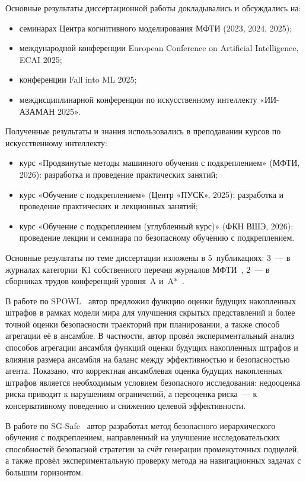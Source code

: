{\probation}
Основные результаты диссертационной работы докладывались и обсуждались на:
\begin{itemize}
  \item семинарах Центра когнитивного моделирования МФТИ (2023, 2024, 2025);
  \item международной конференции European Conference on Artificial Intelligence, ECAI 2025;
  \item конференции Fall into ML 2025;
  \item междисциплинарной конференции по искусственному интеллекту «ИИ-АЗАМАН 2025».
\end{itemize}
Полученные результаты и знания использовались в преподавании курсов по искусственному интеллекту:
\begin{itemize}
  \item курс «Продвинутые методы машинного обучения с подкреплением» (МФТИ, 2026): разработка и проведение практических занятий;
  \item курс «Обучение с подкреплением» (Центр «ПУСК», 2025): разработка и проведение практических и лекционных занятий;
  \item курс «Обучение с подкреплением (углубленный курс)» (ФКН ВШЭ, 2026): проведение лекции и семинара по безопасному обучению с подкреплением.
\end{itemize}

{\publications}
Основные результаты по теме диссертации изложены в 5~публикациях: 3~--- в журналах категории~К1 собственного перечня журналов МФТИ\ifsynopsis\else~\cite{gorbov2026sgsafe,gorbov2026caged,gorbov2026ites}\fi, 2~--- в сборниках трудов конференций уровня~A и~A*\ifsynopsis\else~\cite{latyshev2025spowl,volovikova2025craftext}\fi.

{\contribution}
В работе по SPOWL~ автор предложил функцию оценки будущих накопленных штрафов в рамках модели мира для улучшения скрытых представлений и более точной оценки безопасности траекторий при планировании, а также способ агрегации её в ансамбле. В частности, автор провёл экспериментальный анализ способов агрегации ансамбля функций оценки будущих накопленных штрафов и влияния размера ансамбля на баланс между эффективностью и безопасностью агента. Показано, что корректная ансамблевая оценка будущих накопленных штрафов является необходимым условием безопасного исследования: недооценка риска приводит к нарушениям ограничений, а переоценка риска~--- к консервативному поведению и снижению целевой эффективности.

В работе по SG-Safe~ автор разработал метод безопасного иерархического обучения с подкреплением, направленный на улучшение исследовательских способностей безопасной стратегии за счёт генерации промежуточных подцелей, а также провёл экспериментальную проверку метода на навигационных задачах с большим горизонтом.

